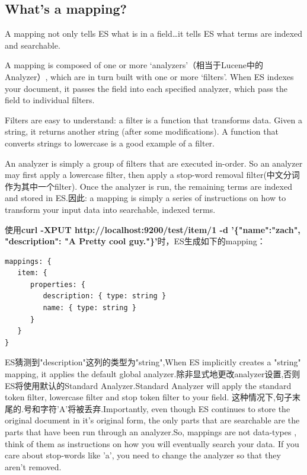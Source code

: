 \subsection{What's a mapping?}
\par A mapping not only tells ES what is in a field…it tells ES what terms are indexed and searchable.
\par A mapping is composed of one or more ‘analyzers’（相当于Lucene中的Analyzer）, which are in turn built with one or more ‘filters’. When ES indexes your document, it passes the field into each specified analyzer, which pass the field to individual filters.
\par Filters are easy to understand: a filter is a function that transforms data. Given a string, it returns another string (after some modifications). A function that converts strings to lowercase is a good example of a filter.
\par An analyzer is simply a group of filters that are executed in-order. So an analyzer may first apply a lowercase filter, then apply a stop-word removal filter(中文分词作为其中一个filter). Once the analyzer is run, the remaining terms are indexed and stored in ES.因此: a mapping is simply a series of instructions on how to transform your input data into searchable, indexed terms.
\par 使用\textbf{curl -XPUT http://localhost:9200/test/item/1 -d '\{"name":"zach", "description": "A Pretty cool guy."\}'}时，ES生成如下的mapping：
\begin{verbatim}
mappings: {
   item: {
      properties: {
         description: { type: string }
         name: { type: string }
      }
   }
}
\end{verbatim}
\par ES猜测到"description"这列的类型为"string",When ES implicitly creates a "string" mapping, it applies the default global analyzer.除非显式地更改analyzer设置,否则ES将使用默认的Standard Analyzer.Standard Analyzer will apply the standard token filter, lowercase filter and stop token filter to your field. 这种情况下,句子末尾的.号和字符'A'将被丢弃.Importantly, even though ES continues to store the original document in it’s original form, the only parts that are searchable are the parts that have been run through an analyzer.So, mappings are not data-types , think of them as instructions on how you will eventually search your data. If you care about stop-words like 'a', you need to change the analyzer so that they aren’t removed.

